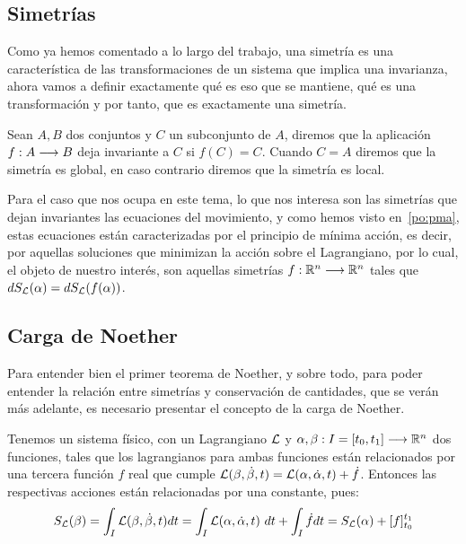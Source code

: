 \subsection{Simetrías}\label{subsec:simetrias}
Como ya hemos comentado a lo largo del trabajo, una simetría es una característica de las transformaciones de un sistema que implica una invarianza, ahora vamos a definir exactamente qué es eso que se mantiene, qué es una transformación y por tanto, que es exactamente una simetría.

Sean $A, B$ dos conjuntos y $C$ un subconjunto de $A$, diremos que la aplicación $f:A\longrightarrow B$ deja invariante a $C$ si $f(C)=C$.
Cuando $C=A$ diremos que la simetría es global, en caso contrario diremos que la simetría es local.

Para el caso que nos ocupa en este tema, lo que nos interesa son las simetrías que dejan invariantes las ecuaciones del movimiento, y como hemos visto en~\eqref{po:pma}, estas ecuaciones están caracterizadas por el principio de mínima acción, es decir, por aquellas soluciones que minimizan la acción sobre el Lagrangiano, por lo cual, el objeto de nuestro interés, son aquellas simetrías $f:\mathbb{R}^n\longrightarrow \mathbb{R}^n$ tales que $dS_{\mathcal{L}}(\alpha)=dS_{\mathcal{L}}(f(\alpha))$.

\subsection{Carga de Noether}\label{subsec:carga-de-noether}
Para entender bien el primer teorema de Noether, y sobre todo, para poder entender la relación entre simetrías y conservación de cantidades, que se verán más adelante, es necesario presentar el concepto de la carga de Noether.

Tenemos un sistema físico, con un Lagrangiano $\mathcal{L}$ y $\alpha,\beta:I=[t_0, t_1]\longrightarrow \mathbb{R}^n$ dos funciones, tales que los lagrangianos para ambas funciones están relacionados por una tercera función $f$ real que cumple $\mathcal{L}(\beta, \dot{\beta}, t) = \mathcal{L}(\alpha, \dot{\alpha}, t)+\dot{f}$.
Entonces las respectivas acciones están relacionadas por una constante, pues:
\begin{equation}
	\label{eq:variación-acción}
	S_{\mathcal{L}}(\beta) = \int_I \mathcal{L}(\beta, \dot{\beta}, t) dt = \int_I \mathcal{L}(\alpha, \dot{\alpha}, t)\ dt+\int_I \dot{f}dt=S_{\mathcal{L}}(\alpha) +[f]_{t_0}^{t_1}
\end{equation}


